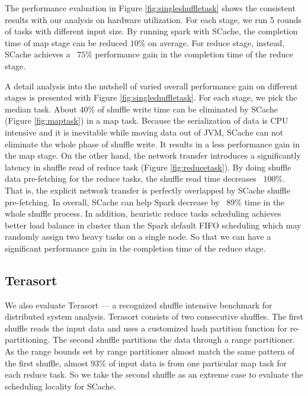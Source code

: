 The performance evaluation in Figure \ref{fig:singleshuffletask} shows the consistent results with our analysis on hardware utilization. For each stage, we run 5 rounds of tasks with different input size. By running spark with SCache, the completion time of map stage can be reduced $10\%$ on average. For reduce stage, instead, SCache achieves a ~$75\%$ performance gain in the completion time of the reduce stage.

A detail analysis into the nutshell of varied overall performance gain on different stages is presented with Figure \ref{fig:singleshuffletask}. For each stage, we pick the median task. About 40\% of shuffle write time can be eliminated by SCache (Figure \ref{fig:maptask}) in a map task. Because the serialization of data is CPU intensive \cite{makingsense} and it is inevitable while moving data out of JVM, SCache can not eliminate the whole phase of shuffle write. It results in a less performance gain in the map stage.
On the other hand, the network transfer introduces a significantly latency in shuffle read of reduce task (Figure \ref{fig:reducetask}). By doing shuffle data pre-fetching for the reduce tasks, the shuffle read time decreases ~$100\%$. That is, the explicit network transfer is perfectly overlapped by SCache shuffle pre-fetching. In overall, SCache can help Spark decrease by ~$89\%$ time in the whole shuffle process. In addition, heuristic reduce tasks scheduling achieves better load balance in cluster than the Spark default FIFO scheduling which may randomly assign two heavy tasks on a single node. So that we can have a significant performance gain in the completion time of the reduce stage.

\subsection{Terasort}
We also evaluate Terasort \cite{spark-tera} --- a recognized shuffle intensive benchmark for distributed system analysis.
Terasort consists of two consecutive shuffles. The first shuffle reads the input data and uses a customized hash partition function for re-partitioning. The second shuffle partitions the data through a range partitioner. As the range bounds set by range partitioner almost match the same pattern of the first shuffle, almost $93\%$ of input data is from one particular map task for each reduce task. So we take the second shuffle as an extreme case to evaluate the scheduling locality for SCache.

